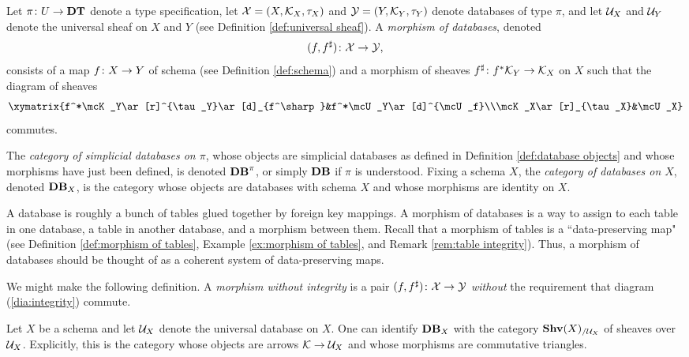 \documentclass{amsart}
\def\DT{{\bf DT}}
\def\Data{{\bf DB}}
\begin{document}
\begin{definition}\label{def:database morphisms}

Let $\pi\taking U\to\DT$ denote a type specification, let $\mathcal{X}=(X,\mathcal{K}_X,\tau_X)$ and $\mathcal{Y}=(Y,\mathcal{K}_Y,\tau_Y)$ denote databases of type $\pi$, and let $\mathcal{U}_X$ and $\mathcal{U}_Y$ denote the universal sheaf on $X$ and $Y$ (see Definition \ref{def:universal sheaf}).  A {\em morphism of databases}, denoted $$(f,f^\sharp)\colon\mathcal{X}\rightarrow\mathcal{Y},$$ consists of a map $f\colon X\rightarrow Y$ of schema (see Definition \ref{def:schema}) and a morphism of sheaves $f^\sharp\colon f^*\mathcal{K}_Y\rightarrow\mathcal{K}_X$ on $X$ such that the diagram of sheaves \begin{eqnarray}\label{dia:integrity}\xymatrix{f^*\mcK_Y\ar[r]^{\tau_Y}\ar[d]_{f^\sharp}&f^*\mcU_Y\ar[d]^{\mcU_f}\\\mcK_X\ar[r]_{\tau_X}&\mcU_X}\end{eqnarray} commutes.

The {\em category of simplicial databases on $\pi$}, whose objects are simplicial databases as defined in Definition \ref{def:database objects} and whose morphisms have just been defined, is denoted $\Data^\pi$, or simply $\Data$ if $\pi$ is understood.  Fixing a schema $X$, the {\em category of databases on $X$}, denoted $\Data_X$, is the category whose objects are databases with schema $X$ and whose morphisms are identity on $X$.  

\end{definition}

\begin{remark}\label{rem:data integrity}

A database is roughly a bunch of tables glued together by foreign key mappings.  A morphism of databases is a way to assign to each table in one database, a table in another database, and a morphism between them.  Recall that a morphism of tables is a ``data-preserving map" (see Definition \ref{def:morphism of tables}, Example \ref{ex:morphism of tables}, and Remark \ref{rem:table integrity}).  Thus, a morphism of databases should be thought of as a coherent system of data-preserving maps.

We might make the following definition.  A {\em morphism without integrity} is a pair $(f,f^\sharp)\colon\mathcal{X}\rightarrow\mathcal{Y}$ {\em without} the requirement that diagram (\ref{dia:integrity}) commute.



\end{remark}

\begin{remark}\label{rem:data_X}

Let $X$ be a schema and let $\mathcal{U}_X$ denote the universal database on $X$.  One can identify $\Data_X$ with the category ${\bf Shv}(X)_{/\mathcal{U}_X}$ of sheaves over $\mathcal{U}_X$.  Explicitly, this is the category whose objects are arrows $\mathcal{K}\rightarrow\mathcal{U}_X$ and whose morphisms are commutative triangles.

\end{remark}
\end{document}
